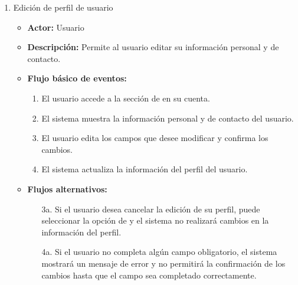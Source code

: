 \begin{enumerate}[CU-1:]
\item{Edición de perfil de usuario}
\begin{itemize}
	\item \textbf{Actor:} Usuario
	\item \textbf{Descripción:} Permite al usuario editar su información personal y de contacto.
	\item \textbf{Flujo básico de eventos:}
	\begin{enumerate}[1:]
		\item El usuario accede a la sección de  en su cuenta.
		\item El sistema muestra la información personal y de contacto del usuario.
		\item El usuario edita los campos que desee modificar y confirma los cambios.
		\item El sistema actualiza la información del perfil del usuario.
		\end{enumerate}
	\item \textbf{Flujos alternativos:}
		\begin{itemize}
		\item[3a.] Si el usuario desea cancelar la edición de su perfil, puede seleccionar la opción de  y el sistema no realizará cambios en la información del perfil.
		\item[4a.] Si el usuario no completa algún campo obligatorio, el sistema mostrará un mensaje de error y no permitirá la confirmación de los cambios hasta que el campo sea completado correctamente.
		\end{itemize}
\end{itemize}


\end{enumerate}
